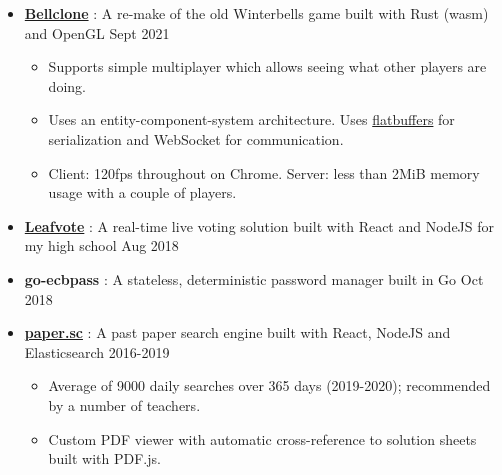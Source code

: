   \begin{itemize}

    \item \href{https://bellclone.maowtm.org/}{\color{link}\textbf{Bellclone}} : A re-make of the old Winterbells game built with Rust (wasm) and OpenGL \dashdiv{} Sept 2021

    \begin{itemize}
      \item Supports simple multiplayer which allows seeing what other players are doing.
      \item Uses an entity-component-system architecture. Uses \href{https://google.github.io/flatbuffers/}{\color{link}flatbuffers} for serialization and WebSocket for communication.
      \item Client: 120fps throughout on Chrome. Server: less than 2MiB memory usage with a couple of players.
    \end{itemize}

    \item \href{https://leafvote.mww.moe}{\color{link}\textbf{Leafvote}} : A real-time live voting solution built with React and NodeJS for my high school \dashdiv{} Aug 2018

    \item \textbf{go-ecbpass} : A stateless, deterministic password manager built in Go \dashdiv{} Oct 2018

    \item \href{https://paper.sc}{\color{link}\textbf{paper.sc}} : A past paper search engine built with React, NodeJS and Elasticsearch \dashdiv{} 2016-2019

    \begin{itemize}
      \item Average of \raisebox{0.2\baselineskip}{\texttildelow}9000 daily searches over 365 days (2019-2020); recommended by a number of teachers.
      \item Custom PDF viewer with automatic cross-reference to solution sheets built with PDF.js.
    \end{itemize}

  \end{itemize}


